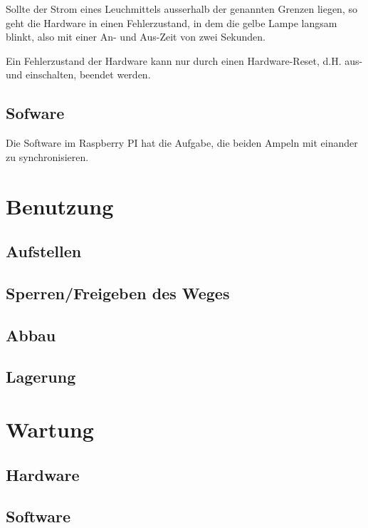 \documentclass{scrartcl}
\begin{document}
Sollte der Strom eines Leuchmittels ausserhalb der genannten Grenzen liegen, so geht die Hardware in einen Fehlerzustand, in dem die gelbe Lampe langsam blinkt, also mit einer An- und Aus-Zeit von zwei Sekunden.

Ein Fehlerzustand der Hardware kann nur durch einen Hardware-Reset, d.H. aus- und einschalten, beendet werden.

\subsection{Sofware}
Die Software im Raspberry PI hat die Aufgabe, die beiden Ampeln mit einander zu synchronisieren.

\section{Benutzung}
\subsection{Aufstellen}
\subsection{Sperren/Freigeben des Weges}
\subsection{Abbau}
\subsection{Lagerung}

\section{Wartung}
\subsection{Hardware}
\subsection{Software}
\end{document}
